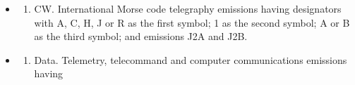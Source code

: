 \documentclass[
  letterpaper,
  DIV=11,
  numbers=noendperiod]{scrreport}
\providecommand{\tightlist}{%
  \setlength{\itemsep}{0pt}\setlength{\parskip}{0pt}}\usepackage{longtable,booktabs,array}
\begin{document}
\begin{itemize}
\item
  \begin{enumerate}
  \def\labelenumi{(\arabic{enumi})}
  \tightlist
  \item
    CW. International Morse code telegraphy emissions having designators
    with A, C, H, J or R as the first symbol; 1 as the second symbol; A
    or B as the third symbol; and emissions J2A and J2B.
  \end{enumerate}
\item
  \begin{enumerate}
  \def\labelenumi{(\arabic{enumi})}
  \setcounter{enumi}{1}
  \tightlist
  \item
    Data. Telemetry, telecommand and computer communications emissions
    having
  \end{enumerate}


\end{itemize}
\end{document}
